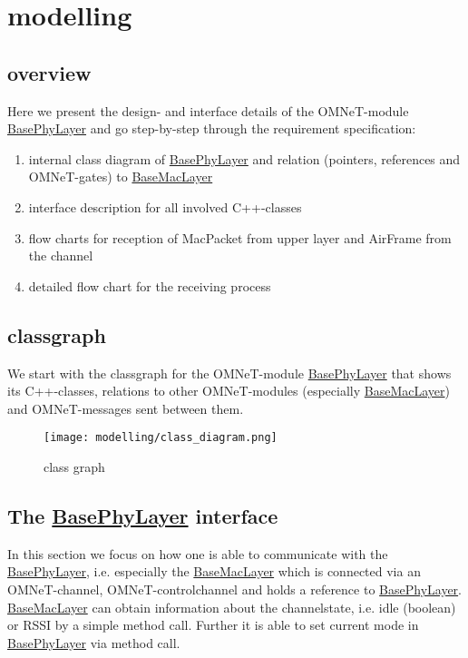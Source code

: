 \newcommand{\h}[1]{\underline{#1}}
\newcommand{\bp}{BasePhyLayer}
\newcommand{\bm}{BaseMacLayer}


\section{modelling}

\subsection{overview}

Here we present the design- and interface details of the OMNeT-module \h{\bp} and go step-by-step through the requirement specification:

\begin{enumerate}
 \item internal class diagram of \h{\bp} and relation (pointers, references and OMNeT-gates) to \h{\bm}
 \item interface description for all involved \textsf{C++}-classes
 \item flow charts for reception of MacPacket from upper layer and AirFrame from the channel
 \item detailed flow chart for the receiving process
\end{enumerate}

\subsection{classgraph}

We start with the classgraph for the OMNeT-module \h{\bp} that shows its
\textsf{C++}-classes, relations to other OMNeT-modules (especially \h{\bm})
and OMNeT-messages sent between them.

\begin{figure}[H]
 \centering
 \texttt{[image: modelling/class\_diagram.png]}
 \caption{class graph}
 \label{fig: classgraph}
\end{figure}
\newpage

\subsection{The \h{\bp} interface}

In this section we focus on how one is able to communicate with the \h{\bp}, i.e. 
especially the \h{\bm} which is connected via an OMNeT-channel, OMNeT-controlchannel and holds a reference to \h{\bp}.
\h{\bm} can obtain information about the channelstate, i.e. idle (boolean) or RSSI by 
a simple method call. Further it is able to set current mode in \h{\bp} via method call.

